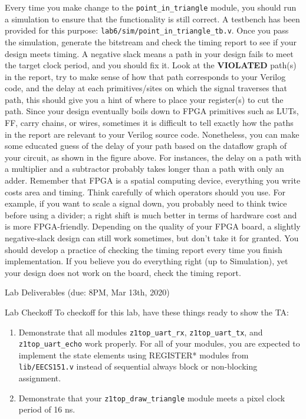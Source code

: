 \documentclass[11pt]{article}
\makeatletter
\renewcommand{\section}
{\@startsection {section}{1}{0pt}
 {-2ex}
 {1ex}
 {\bfseries\Large}}
\renewcommand{\subsection}
{\@startsection {subsection}{1}{0pt}
 {-1ex}
 {0.5ex}
 {\bfseries\normalsize}}
\makeatother
\begin{document}
Every time you make change to the \verb|point_in_triangle| module, you should run a simulation to ensure that the functionality is still correct. A testbench has been provided for this purpose: \verb|lab6/sim/point_in_triangle_tb.v|. Once you pass the simulation, generate the bitstream and check the timing report to see if your design meets timing. A negative slack means a path in your design fails to meet the target clock period, and you should fix it. Look at the \textbf{VIOLATED} path(s) in the report, try to make sense of how that path corresponds to your Verilog code, and the delay at each primitives/sites on which the signal traverses that path, this should give you a hint of where to place your register(s) to cut the path. Since your design eventually boils down to FPGA primitives such as LUTs, FF, carry chains, or wires, sometimes it is difficult to tell exactly how the paths in the report are relevant to your Verilog source code. Nonetheless, you can make some educated guess of the delay of your path based on the dataflow graph of your circuit, as shown in the figure above. For instances, the delay on a path with a multiplier and a subtractor probably takes longer than a path with only an adder. Remember that FPGA is a spatial computing device, everything you write costs area and timing. Think carefully of which operators should you use. For example, if you want to scale a signal down, you probably need to think twice before using a divider; a right shift is much better in terms of hardware cost and is more FPGA-friendly. Depending on the quality of your FPGA board, a slightly negative-slack design can still work sometimes, but don't take it for granted. You should develop a practice of checking the timing report every time you finish implementation. If you believe you do everything right (up to Simulation), yet your design does not work on the board, check the timing report.

\section{Lab Deliverables (due: 8PM, Mar 13th, 2020)}
\subsection{Lab Checkoff}
To checkoff for this lab, have these things ready to show the TA:
\begin{enumerate}
  \item Demonstrate that all modules \verb|z1top_uart_rx|, \verb|z1top_uart_tx|, and \verb|z1top_uart_echo| work properly. For all of your modules, you are expected to implement the state elements using REGISTER* modules from \verb|lib/EECS151.v| instead of sequential always block or non-blocking assignment.
  \item Demonstrate that your \verb|z1top_draw_triangle| module meets a pixel clock period of 16 ns.

\end{enumerate}
\end{document}
